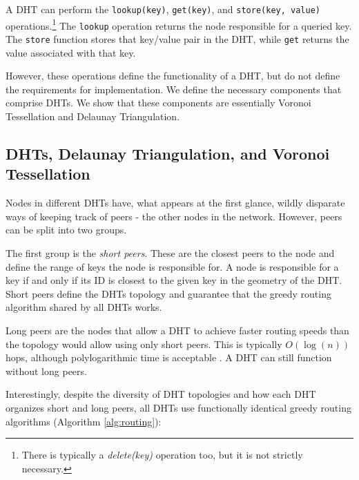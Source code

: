A DHT can perform the \texttt{lookup(key)}, \texttt{get(key)}, and \texttt{store(key, value)} operations.\footnote{There is typically a \textit{delete(key)} operation too, but it is not strictly necessary.}
The \texttt{lookup} operation returns the node responsible for a queried key.
The \texttt{store} function stores that key/value pair in the DHT, while \texttt{get} returns the value associated with that key.

However, these operations define the functionality of a DHT, but do not define the requirements for implementation.
We define the necessary components that comprise DHTs.
We show that these components are essentially Voronoi Tessellation and Delaunay Triangulation.

\subsection{DHTs, Delaunay Triangulation, and Voronoi Tessellation}

Nodes in different DHTs have, what appears at the first glance, wildly disparate ways of keeping track of peers - the other nodes in the network.
However, peers can be split into two groups.

The first group is the \textit{short peers}.
These are the closest peers to the node and define the range of keys the node is responsible for. 
A node is responsible for a key if and only if its ID is closest to the given key in the geometry of the DHT.
Short peers define the DHTs topology and guarantee that the greedy routing algorithm shared by all DHTs works.


Long peers are the nodes that allow a DHT to achieve faster routing speeds than the topology would allow using only short peers.
This is typically $ O(\log(n)) $ hops, although polylogarithmic time is acceptable \cite{kleinberg2000small}.
A DHT can still function without long peers.

Interestingly, despite the diversity of DHT topologies and how each DHT organizes short and long peers,  all DHTs use functionally identical greedy routing algorithms (Algorithm \ref{alg:routing}):

